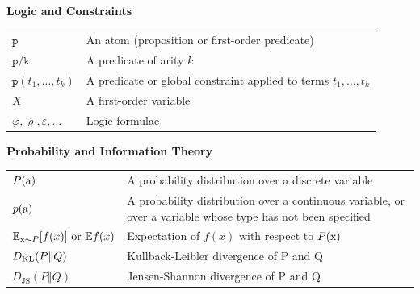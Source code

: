 \documentclass[a4paper,twoside,openright]{book}
\theoremstyle{plain}
\theoremstyle{definition}
\begin{document}
\centerline{\bf Logic and Constraints}
\nopagebreak
\begin{tabular}{p{2cm}p{11cm}}
	$\displaystyle \texttt{p}$ & An atom (proposition or first-order predicate)\\
	$\displaystyle \texttt{p/k}$ & A predicate of arity $k$\\
	$\displaystyle \texttt{p}(t_1, \dots, t_k)$ & A predicate or global constraint applied to terms $t_1, \dots, t_k$\\
	$\displaystyle X$ & A first-order variable\\
	$\displaystyle \varphi, \varrho, \varepsilon, \dots$ & Logic formulae\\
\end{tabular}
\vspace{0.5cm}

\centerline{\bf Probability and Information Theory}
\nopagebreak
\begin{tabular}{p{4cm}p{9cm}}
	$\displaystyle P({\textnormal{a}})$ & A probability distribution over a discrete variable\\
	$\displaystyle p({\textnormal{a}})$ & A probability distribution over a continuous variable, or over
	a variable whose type has not been specified\\
	$\displaystyle  \mathbb{E}_{{\textnormal{x}}\sim P} [ f(x) ]\text{ or } \mathbb{E} f(x)$ & Expectation of $f(x)$ with respect to $P({\textnormal{x}})$ \\
	$\displaystyle D_{\mathrm{KL}} ( P \Vert Q ) $ & Kullback-Leibler divergence of P and Q \\
	$\displaystyle D_{\mathrm{JS}} ( P \Vert Q ) $ & Jensen-Shannon divergence of P and Q \\
\end{tabular}
\vspace{0.5cm}
\end{document}

